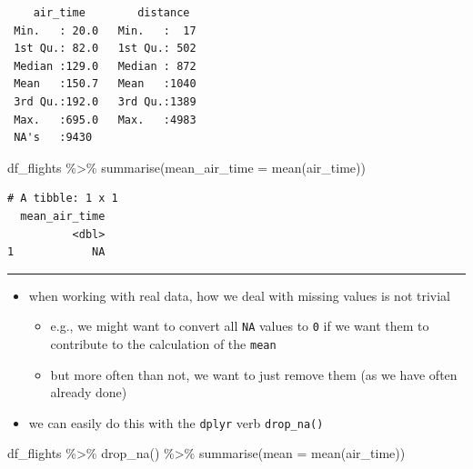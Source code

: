 \documentclass[
  letterpaper,
  DIV=11]{scrartcl}
\newenvironment{Shaded}{\begin{snugshade}}{\end{snugshade}}
\newcommand{\AttributeTok}[1]{\textcolor[rgb]{0.40,0.45,0.13}{#1}}
\newcommand{\FunctionTok}[1]{\textcolor[rgb]{0.28,0.35,0.67}{#1}}
\newcommand{\NormalTok}[1]{\textcolor[rgb]{0.00,0.23,0.31}{#1}}
\newcommand{\SpecialCharTok}[1]{\textcolor[rgb]{0.37,0.37,0.37}{#1}}
\providecommand{\tightlist}{%
  \setlength{\itemsep}{0pt}\setlength{\parskip}{0pt}}\usepackage{longtable,booktabs,array}
\begin{document}
\begin{verbatim}
    air_time        distance   
 Min.   : 20.0   Min.   :  17  
 1st Qu.: 82.0   1st Qu.: 502  
 Median :129.0   Median : 872  
 Mean   :150.7   Mean   :1040  
 3rd Qu.:192.0   3rd Qu.:1389  
 Max.   :695.0   Max.   :4983  
 NA's   :9430                  
\end{verbatim}

\begin{Shaded}
\begin{Highlighting}[]
\NormalTok{df\_flights }\SpecialCharTok{\%\textgreater{}\%} 
  \FunctionTok{summarise}\NormalTok{(}\AttributeTok{mean\_air\_time =} \FunctionTok{mean}\NormalTok{(air\_time))}
\end{Highlighting}
\end{Shaded}

\begin{verbatim}
# A tibble: 1 x 1
  mean_air_time
          <dbl>
1            NA
\end{verbatim}

\begin{center}\rule{0.5\linewidth}{0.5pt}\end{center}

\begin{itemize}
\tightlist
\item
  when working with real data, how we deal with missing values is not
  trivial

  \begin{itemize}
  \tightlist
  \item
    e.g., we might want to convert all \texttt{NA} values to \texttt{0}
    if we want them to contribute to the calculation of the
    \texttt{mean}
  \item
    but more often than not, we want to just remove them (as we have
    often already done)
  \end{itemize}
\item
  we can easily do this with the \texttt{dplyr} verb \texttt{drop\_na()}
\end{itemize}

\begin{Shaded}
\begin{Highlighting}[]
\NormalTok{df\_flights }\SpecialCharTok{\%\textgreater{}\%} 
  \FunctionTok{drop\_na}\NormalTok{() }\SpecialCharTok{\%\textgreater{}\%} 
  \FunctionTok{summarise}\NormalTok{(}\AttributeTok{mean =} \FunctionTok{mean}\NormalTok{(air\_time))}
\end{Highlighting}
\end{Shaded}
\end{document}
